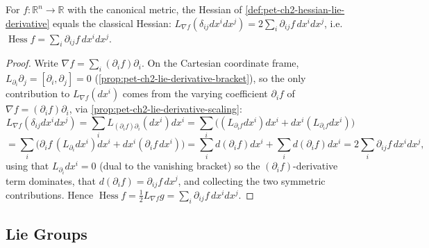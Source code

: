 \begin{proposition}
  \label{prop:pet-ch2-hessian-euclidean-agreement}
  \leanok
  For $f:\mathbb{R}^n\to\mathbb{R}$ with the canonical metric, the Hessian of
  \cref{def:pet-ch2-hessian-lie-derivative} equals the classical Hessian:
  $L_{\nabla f}(\delta_{ij}dx^idx^j)=2\sum_i\partial_{ij}f\,dx^idx^j$, i.e.
  $\operatorname{Hess}f=\sum_i\partial_{ij}f\,dx^idx^j$.
\end{proposition}
\begin{proof}
  \leanok
  Write $\nabla f=\sum_i(\partial_if)\partial_i$. On the Cartesian coordinate frame,
  $L_{\partial_i}\partial_j=[\partial_i,\partial_j]=0$
  (\cref{prop:pet-ch2-lie-derivative-bracket}), so the only contribution to
  $L_{\nabla f}(dx^i)$ comes from the varying coefficient $\partial_if$ of
  $\nabla f=(\partial_if)\partial_i$, via \cref{prop:pet-ch2-lie-derivative-scaling}:
  \[
    L_{\nabla f}(\delta_{ij}dx^idx^j)
    = \sum_iL_{(\partial_if)\partial_i}(dx^i)dx^i
    = \sum_i\Big((L_{\partial_if}dx^i)dx^i+dx^i(L_{\partial_if}dx^i)\Big)
  \]
  \[
    = \sum_i\Big(\partial_if\,(L_{\partial_i}dx^i)dx^i+dx^i(\partial_if\,dx^i)\Big)
    = \sum_id(\partial_if)dx^i+\sum_id(\partial_if)dx^i
    = 2\sum_i\partial_{ij}f\,dx^idx^j,
  \]
  using that $L_{\partial_i}dx^i=0$ (dual to the vanishing bracket) so the
  $(\partial_if)$-derivative term dominates, that $d(\partial_if)=\partial_{ij}f\,dx^j$,
  and collecting the two symmetric contributions. Hence
  $\operatorname{Hess}f=\frac12L_{\nabla f}g=\sum_i\partial_{ij}f\,dx^idx^j$.
\end{proof}

\subsection{Lie Groups}

